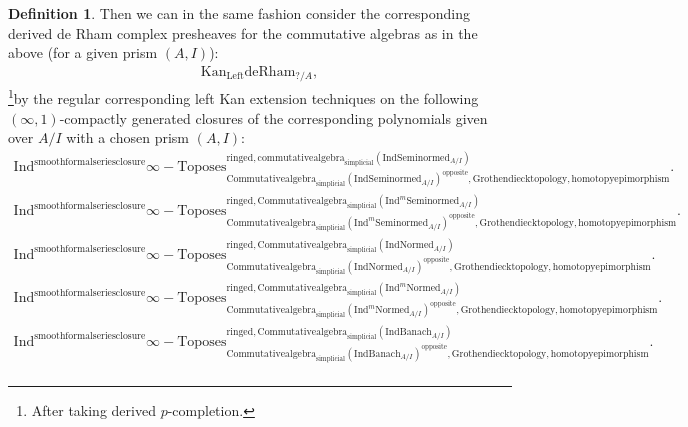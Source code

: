 \documentclass[11pt]{book}
\theoremstyle{definition}
\newtheorem{definition}[theorem]{Definition}
\numberwithin{equation}{section}
\begin{document}
\begin{definition}
Then we can in the same fashion consider the corresponding derived de Rham complex presheaves for the commutative algebras as in the above (for a given prism $(A,I)$):
\begin{align}
\mathrm{Kan}_{\mathrm{Left}}\mathrm{deRham}_{?/A},	
\end{align}
\footnote{After taking derived $p$-completion.}by the regular corresponding left Kan extension techniques on the following $(\infty,1)$-compactly generated closures of the corresponding polynomials given over $A/I$ with a chosen prism $(A,I)$:\\

\begin{align}
\mathrm{Ind}^\text{smoothformalseriesclosure}\infty-\mathrm{Toposes}^{\mathrm{ringed},\mathrm{commutativealgebra}_{\mathrm{simplicial}}(\mathrm{Ind}\mathrm{Seminormed}_{A/I})}_{\mathrm{Commutativealgebra}_{\mathrm{simplicial}}(\mathrm{Ind}\mathrm{Seminormed}_{A/I})^\mathrm{opposite},\mathrm{Grothendiecktopology,homotopyepimorphism}}. \\
\mathrm{Ind}^\text{smoothformalseriesclosure}\infty-\mathrm{Toposes}^{\mathrm{ringed},\mathrm{Commutativealgebra}_{\mathrm{simplicial}}(\mathrm{Ind}^m\mathrm{Seminormed}_{A/I})}_{\mathrm{Commutativealgebra}_{\mathrm{simplicial}}(\mathrm{Ind}^m\mathrm{Seminormed}_{A/I})^\mathrm{opposite},\mathrm{Grothendiecktopology,homotopyepimorphism}}.\\
\mathrm{Ind}^\text{smoothformalseriesclosure}\infty-\mathrm{Toposes}^{\mathrm{ringed},\mathrm{Commutativealgebra}_{\mathrm{simplicial}}(\mathrm{Ind}\mathrm{Normed}_{A/I})}_{\mathrm{Commutativealgebra}_{\mathrm{simplicial}}(\mathrm{Ind}\mathrm{Normed}_{A/I})^\mathrm{opposite},\mathrm{Grothendiecktopology,homotopyepimorphism}}.\\
\mathrm{Ind}^\text{smoothformalseriesclosure}\infty-\mathrm{Toposes}^{\mathrm{ringed},\mathrm{Commutativealgebra}_{\mathrm{simplicial}}(\mathrm{Ind}^m\mathrm{Normed}_{A/I})}_{\mathrm{Commutativealgebra}_{\mathrm{simplicial}}(\mathrm{Ind}^m\mathrm{Normed}_{A/I})^\mathrm{opposite},\mathrm{Grothendiecktopology,homotopyepimorphism}}.\\
\mathrm{Ind}^\text{smoothformalseriesclosure}\infty-\mathrm{Toposes}^{\mathrm{ringed},\mathrm{Commutativealgebra}_{\mathrm{simplicial}}(\mathrm{Ind}\mathrm{Banach}_{A/I})}_{\mathrm{Commutativealgebra}_{\mathrm{simplicial}}(\mathrm{Ind}\mathrm{Banach}_{A/I})^\mathrm{opposite},\mathrm{Grothendiecktopology,homotopyepimorphism}}.\\

\end{align}
\end{definition}
\end{document}

